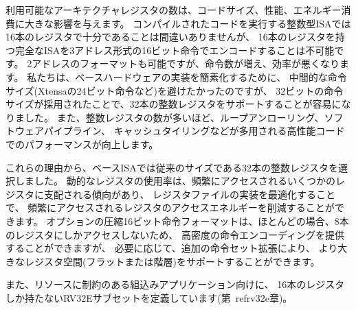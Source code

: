 \begin{commentary}
利用可能なアーキテクチャレジスタの数は、コードサイズ、性能、エネルギー消費に大きな影響を与えます。 
コンパイルされたコードを実行する整数型ISAでは16本のレジスタで十分であることは間違いありませんが、
16本のレジスタを持つ完全なISAを3アドレス形式の16ビット命令でエンコードすることは不可能です。
2アドレスのフォーマットも可能ですが、命令数が増え、効率が悪くなります。
私たちは、ベースハードウェアの実装を簡素化するために、
中間的な命令サイズ(Xtensaの24ビット命令など)を避けたかったのですが、
32ビットの命令サイズが採用されたことで、32本の整数レジスタをサポートすることが容易になりました。
また、整数レジスタの数が多いほど、ループアンローリング、ソフトウェアパイプライン、
キャッシュタイリングなどが多用される高性能コードでのパフォーマンスが向上します。

これらの理由から、ベースISAでは従来のサイズである32本の整数レジスタを選択しました。
動的なレジスタの使用率は、頻繁にアクセスされるいくつかのレジスタに支配される傾向があり、
レジスタファイルの実装を最適化することで、
頻繁にアクセスされるレジスタのアクセスエネルギーを削減することができます。 
オプションの圧縮16ビット命令フォーマットは、ほとんどの場合、8本のレジスタにしかアクセスしないため、
高密度の命令エンコーディングを提供することができますが、
必要に応じて、追加の命令セット拡張により、
より大きなレジスタ空間(フラットまたは階層)をサポートすることができます。

また、リソースに制約のある組込みアプリケーション向けに、
16本のレジスタしか持たないRV32Eサブセットを定義しています(第~ref{rv32e}章)。
\end{commentary}

\begin{comment}
\section{Base Instruction Formats}

In the base RV32I ISA, there are four core instruction formats
(R/I/S/U), as shown in Figure~\ref{fig:baseinstformats}.  All are a
fixed 32 bits in length and must be aligned on a four-byte boundary in
memory.  An instruction-address-misaligned exception is generated on a
taken branch or unconditional jump if the target address is not
four-byte aligned.  This exception is reported on the branch or jump
instruction, not on the target instruction.  No
instruction-address-misaligned exception is generated for a
conditional branch that is not taken.
\end{comment}


